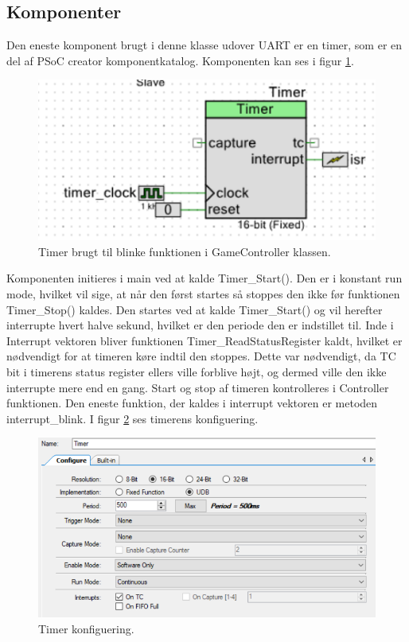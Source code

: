 \documentclass[Softwaredesign/Softwaredesign_main.tex]{subfiles}
\begin{document}
\subsection{Komponenter}
Den eneste komponent brugt i denne klasse udover UART er en timer, som er en del af PSoC creator komponentkatalog. Komponenten kan ses i figur \ref{fig:Timer}.
\begin{figure}
    \centering 
    \includegraphics[width=\linewidth]{Softwaredesign/GameController/graphic/gamecontroller_timer.PNG}
    \caption{Timer brugt til blinke funktionen i GameController klassen.}
    \label{fig:Timer}
\end{figure}
Komponenten initieres i main ved at kalde Timer\_Start(). Den er i konstant run mode, hvilket vil sige, at når den først startes så stoppes den ikke før funktionen Timer\_Stop() kaldes. Den startes ved at kalde Timer\_Start() og vil herefter interrupte hvert halve sekund, hvilket er den periode den er indstillet til. Inde i Interrupt vektoren bliver funktionen Timer\_ReadStatusRegister kaldt, hvilket er nødvendigt for at timeren køre indtil den stoppes. Dette var nødvendigt, da TC bit i timerens status register  ellers ville forblive højt, og dermed ville den ikke interrupte mere end en gang. Start og stop af timeren kontrolleres i Controller funktionen. Den eneste funktion, der kaldes i interrupt vektoren er metoden interrupt\_blink. I figur \ref{fig:Timer_setting} ses timerens konfiguering.
\begin{figure}
    \centering 
    \includegraphics[width=\linewidth]{Softwaredesign/GameController/graphic/timer_settings.PNG}
    \caption{Timer konfiguering.}
    \label{fig:Timer_setting}
\end{figure}
\end{document}
